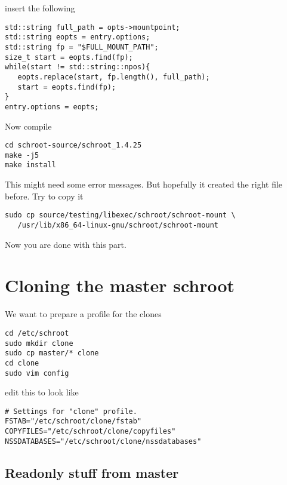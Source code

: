 \documentclass[a4paper]{book}
\begin{document}
insert the following

\begin{verbatim}
std::string full_path = opts->mountpoint;
std::string eopts = entry.options;
std::string fp = "$FULL_MOUNT_PATH";
size_t start = eopts.find(fp);
while(start != std::string::npos){
   eopts.replace(start, fp.length(), full_path);
   start = eopts.find(fp);
}
entry.options = eopts;
\end{verbatim}

Now compile

\begin{verbatim}
cd schroot-source/schroot_1.4.25
make -j5
make install
\end{verbatim}

This might need some error messages. But hopefully it created the right file
before. Try to copy it

\begin{verbatim}
sudo cp source/testing/libexec/schroot/schroot-mount \
   /usr/lib/x86_64-linux-gnu/schroot/schroot-mount 
\end{verbatim}

Now you are done with this part.
\section{Cloning the master schroot}

We want to prepare a profile for the clones

\begin{verbatim}
cd /etc/schroot
sudo mkdir clone
sudo cp master/* clone
cd clone
sudo vim config
\end{verbatim}

edit this to look like

\begin{verbatim}
# Settings for "clone" profile.
FSTAB="/etc/schroot/clone/fstab"
COPYFILES="/etc/schroot/clone/copyfiles"
NSSDATABASES="/etc/schroot/clone/nssdatabases"
\end{verbatim}

\subsection{Readonly stuff from master}
\end{document}
